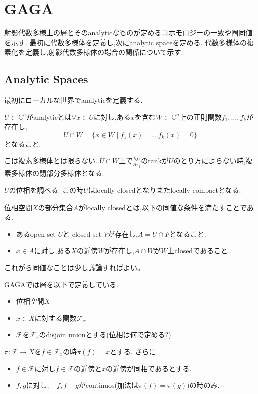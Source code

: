 \chapter{GAGA}
射影代数多様上の層とそのanalyticなものが定めるコホモロジーの一致や圏同値を示す.
最初に代数多様体を定義し,次にanalytic spaceを定める.
代数多様体の複素化を定義し,射影代数多様体の場合の関係について示す.


\section{Analytic Spaces}
最初にローカルな世界でanalyticを定義する.
\begin{screen}
\begin{dfn}
$U \subset \mathbb{C}^n$がanalyticとは$\forall x \in U$に対し,ある$x$を含む$W \subset \mathbb{C}^n$上の正則関数$f_1, \ldots ,f_k$が存在し,
\begin{equation*}
  U \cap W = \{x \in W \mid f_1(x) = \ldots  f_k(x) = 0 \}
\end{equation*}
となること.
\end{dfn}
\end{screen}

こは複素多様体とは限らない.
$U \cap W$上で$ \frac{\partial f_i}{\partial x_j}$のrankが$U$のとり方によらない時,複素多様体の閉部分多様体となる.

$U$の位相を調べる.
この時$U$はlocally closedとなりまたlocally compactとなる.
\begin{screen}
\begin{dfn}
位相空間$X$の部分集合$A$がlocally closedとは,以下の同値な条件を満たすことである.
\begin{itemize}
  \item あるopen set $U$と closed set $V$が存在し,$A = U \cap F$となること.
  \item $x \in A$に対し,ある$X$の近傍$W$が存在し,$A \cap W$が$W$上closedであること
\end{itemize}
\end{dfn}
\end{screen}

これがら同値なことは少し議論すればよい。

GAGAでは層を以下で定義している.
\begin{itemize}
  \item 位相空間$X$
  \item $x \in X$に対する関数$\mathcal{F}_x$
  \item $\mathcal{F}$を$\mathcal{F}_x$のdisjoin unionとする(位相は何で定める?)
\end{itemize}
$\pi: \mathcal{F} \to X$を$f \in \mathcal{F}_x$の時$\pi(f)=x$とする.
さらに
\begin{itemize}
  \item $f \in \mathcal{F}$に対し$f \in \mathcal{F}$の近傍と$x$の近傍が同相であるとする.
  \item $f,g$に対し, $-f , f + g$がcontinuos(加法は$\pi(f) = \pi(g))$の時のみ.
\end{itemize}

